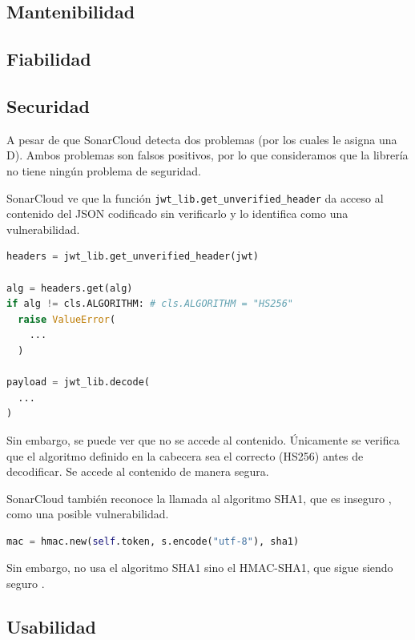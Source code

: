 \documentclass{article}
\begin{document}
\subsection{Mantenibilidad}

\subsection{Fiabilidad}

\subsection{Securidad}

A pesar de que SonarCloud detecta dos problemas
(por los cuales le asigna una D).
Ambos problemas son falsos positivos, 
por lo que consideramos que la librería no tiene ningún problema de seguridad.

\hfill

SonarCloud ve que la función \verb|jwt_lib.get_unverified_header|
da acceso al contenido del JSON codificado sin verificarlo
y lo identifica como una vulnerabilidad.

\begin{lstlisting}[language=Python]
headers = jwt_lib.get_unverified_header(jwt)

alg = headers.get(alg)
if alg != cls.ALGORITHM: # cls.ALGORITHM = "HS256"
  raise ValueError(
    ...
  )

payload = jwt_lib.decode(
  ...
)
\end{lstlisting}

Sin embargo, se puede ver que no se accede al contenido.
Únicamente se verifica que el algoritmo definido en la cabecera
sea el correcto (HS256) antes de decodificar.
Se accede al contenido de manera segura.

\hfill

SonarCloud también reconoce la llamada al algoritmo SHA1,
que es inseguro \cite{sha1-broken},
como una posible vulnerabilidad.

\begin{lstlisting}[language=Python]
mac = hmac.new(self.token, s.encode("utf-8"), sha1)
\end{lstlisting}

Sin embargo, no usa el algoritmo SHA1
sino el HMAC-SHA1, que sigue siendo seguro \cite{hmac-sha1}.

\subsection{Usabilidad}
\end{document}
